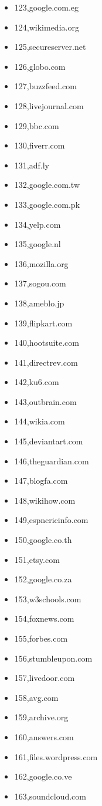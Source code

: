 \begin{multicols}{3}
\begin{itemize}
	\item 123,google.com.eg
	\item 124,wikimedia.org
	\item 125,secureserver.net
	\item 126,globo.com
	\item 127,buzzfeed.com
	\item 128,livejournal.com
	\item 129,bbc.com
	\item 130,fiverr.com
	\item 131,adf.ly
	\item 132,google.com.tw
	\item 133,google.com.pk
	\item 134,yelp.com
	\item 135,google.nl
	\item 136,mozilla.org
	\item 137,sogou.com
	\item 138,ameblo.jp
	\item 139,flipkart.com
	\item 140,hootsuite.com
	\item 141,directrev.com
	\item 142,ku6.com
	\item 143,outbrain.com
	\item 144,wikia.com
	\item 145,deviantart.com
	\item 146,theguardian.com
	\item 147,blogfa.com
	\item 148,wikihow.com
	\item 149,espncricinfo.com
	\item 150,google.co.th
	\item 151,etsy.com
	\item 152,google.co.za
	\item 153,w3schools.com
	\item 154,foxnews.com
	\item 155,forbes.com
	\item 156,stumbleupon.com
	\item 157,livedoor.com
	\item 158,avg.com
	\item 159,archive.org
	\item 160,answers.com
	\item 161,files.wordpress.com
	\item 162,google.co.ve
	\item 163,soundcloud.com

\end{itemize}
\end{multicols}
